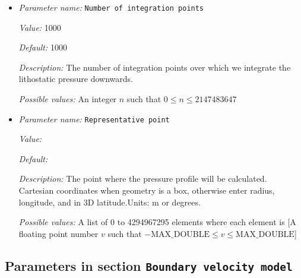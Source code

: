 \begin{itemize}
\item {\it Parameter name:} {\tt Number of integration points}
\label{parameters:Boundary traction model/Initial lithostatic pressure/Number of integration points}


{\it Value:} 1000


{\it Default:} 1000


{\it Description:} The number of integration points over which we integrate the lithostatic pressure downwards. 


{\it Possible values:} An integer $n$ such that $0\leq n \leq 2147483647$
\item {\it Parameter name:} {\tt Representative point}
\label{parameters:Boundary traction model/Initial lithostatic pressure/Representative point}


{\it Value:} 


{\it Default:} 


{\it Description:} The point where the pressure profile will be calculated. Cartesian coordinates when geometry is a box, otherwise enter radius, longitude, and in 3D latitude.Units: m or degrees.


{\it Possible values:} A list of 0 to 4294967295 elements where each element is [A floating point number $v$ such that $-\text{MAX\_DOUBLE} \leq v \leq \text{MAX\_DOUBLE}$]
\end{itemize}

\subsection{Parameters in section \tt Boundary velocity model}
\label{parameters:Boundary_20velocity_20model}

